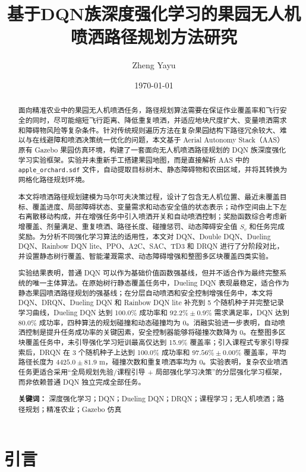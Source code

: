 \documentclass[UTF8]{ctexart}
\title{基于DQN族深度强化学习的果园无人机喷洒路径规划方法研究}
\author{Zheng Yayu}
\date{\today}
\begin{document}
\maketitle

\begin{abstract}
面向精准农业中的果园无人机喷洒任务，路径规划算法需要在保证作业覆盖率和飞行安全的同时，尽可能缩短飞行距离、降低重复喷洒，并适应地块尺度扩大、变量喷洒需求和障碍物风险等复杂条件。针对传统规则遍历方法在复杂果园结构下路径冗余较大、难以与在线避障和喷洒决策统一优化的问题，本文基于 Aerial Autonomy Stack（AAS）原有 Gazebo 果园仿真环境，构建了一套面向无人机喷洒路径规划的 DQN 族深度强化学习实验框架。实验并未重新手工搭建果园地图，而是直接解析 AAS 中的 \texttt{apple\_orchard.sdf} 文件，自动提取目标树木、静态障碍物和农田区域，并将其转换为网格化路径规划环境。

本文将喷洒路径规划建模为马尔可夫决策过程，设计了包含无人机位置、最近未覆盖目标、覆盖进度、局部障碍状态、变量需求和动态安全值的状态表示；动作空间由上下左右离散移动构成，并在增强任务中引入喷洒开关和自动喷洒控制；奖励函数综合考虑新增覆盖、剂量满足、重复喷洒、路径长度、碰撞惩罚、动态障碍安全值 $S_v$ 和任务完成奖励。为分析不同强化学习算法的适用性，本文对 DQN、Double DQN、Dueling DQN、Rainbow DQN lite、PPO、A2C、SAC、TD3 和 DRQN 进行了分阶段对比，并设置静态树行覆盖、智能灌溉需求、动态障碍增强和整图多区块覆盖四类实验。

实验结果表明，普通 DQN 可以作为基础价值函数强基线，但并不适合作为最终完整系统的唯一主体算法。在原始树行静态覆盖任务中，Dueling DQN 表现最稳定，适合作为静态果园喷洒路径规划的强基线；在分层自动喷洒和安全控制增强任务中，本文将 DQN、DRQN、Dueling DQN 和 Rainbow DQN lite 补充到 5 个随机种子并完整记录学习曲线，Dueling DQN 达到 100.0\% 成功率和 $92.2\%\pm0.9\%$ 需求满足率，DQN 达到 80.0\% 成功率，四种算法的规划碰撞和动态碰撞均为 0。消融实验进一步表明，自动喷洒控制是提升任务成功率的关键因素，安全控制器能够将碰撞次数降为 0。在整图多区块覆盖任务中，未引导强化学习短训最高仅达到 15.9\% 覆盖率；引入课程式专家引导探索后，DRQN 在 3 个随机种子上达到 100.0\% 成功率和 $97.56\%\pm0.00\%$ 覆盖率，平均路径长度为 $4425.0\pm81.9$ m，碰撞次数和重复喷洒率均为 0。实验表明，复杂农业喷洒任务更适合采用“全局规划先验/课程引导 + 局部强化学习决策”的分层强化学习框架，而非依赖普通 DQN 独立完成全部任务。

\textbf{关键词：} 深度强化学习；DQN；Dueling DQN；DRQN；课程学习；无人机喷洒；路径规划；精准农业；Gazebo 仿真
\end{abstract}

\section{引言}
\end{document}
